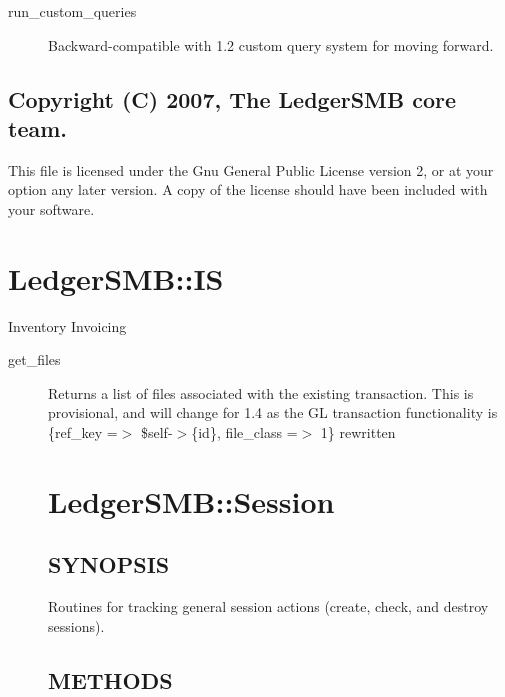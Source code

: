 \begin{description}
\begin{description}
\begin{description}
\begin{description}
\begin{description}
\begin{description}
\item[{run\_custom\_queries}] \mbox{}

Backward-compatible with 1.2 custom query system for moving forward.

\end{description}
\subsection*{Copyright (C) 2007, The LedgerSMB core team.\label{LedgerSMB::DBObject_Copyright_C_2007_The_LedgerSMB_core_team_}}


This file is licensed under the Gnu General Public License version 2, or at your
option any later version.  A copy of the license should have been included with
your software.

\section{LedgerSMB::IS\label{LedgerSMB::IS}}


Inventory Invoicing

\begin{description}

\item[{get\_files}] \mbox{}

Returns a list of files associated with the existing transaction.  This is 
provisional, and will change for 1.4 as the GL transaction functionality is 
                  \{ref\_key =$>$ \$self-$>$\{id\}, file\_class =$>$ 1\}
rewritten

\section{LedgerSMB::Session\label{LedgerSMB::Session}}




\subsection*{SYNOPSIS\label{LedgerSMB::Session_SYNOPSIS}}


Routines for tracking general session actions (create, check, and destroy 
sessions).

\subsection*{METHODS\label{LedgerSMB::Session_METHODS}}
\begin{description}


\end{description}
\end{description}
\end{description}
\end{description}
\end{description}
\end{description}
\end{description}
